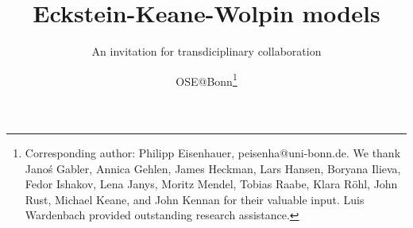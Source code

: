 
\title{Eckstein-Keane-Wolpin models}
\subtitle{An invitation for transdiciplinary collaboration}
\author{OSE@Bonn\thanks{Corresponding author: Philipp Eisenhauer, peisenha@uni-bonn.de. We thank  Jano\'s Gabler, Annica Gehlen, James Heckman, Lars Hansen, Boryana Ilieva, Fedor Ishakov, Lena Janys, Moritz Mendel, Tobias Raabe, Klara R\"ohl, John Rust, Michael Keane, and John Kennan for their valuable input. Luis Wardenbach provided outstanding research assistance.}}
\date{}
